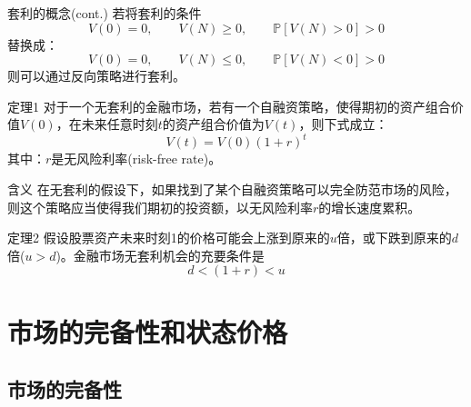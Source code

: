 \documentclass[t]{beamer}
\renewcommand{\Pr}{\mathbb{P}}
\begin{document}
\begin{frame}{套利的概念(cont.)}
若将套利的条件$$V(0)=0,\qquad V(N)\ge 0,\qquad \Pr[V(N)>0]>0 $$
替换成：
\[V(0)=0,\qquad V(N)\le 0,\qquad \Pr[V(N)<0]>0 \]
则可以通过反向策略进行套利。
\end{frame}

\begin{frame}{定理1}
对于一个无套利的金融市场，若有一个自融资策略，使得期初的资产组合价值$V(0)$，在未来任意时刻$t$的资产组合价值为$V(t)$，则下式成立：
\[V(t)=V(0)(1+r)^t \]
其中：$r$是无风险利率(risk-free rate)。

\begin{block}{含义}
在无套利的假设下，如果找到了某个自融资策略可以完全防范市场的风险，则这个策略应当使得我们期初的投资额，以无风险利率$r$的增长速度累积。
\end{block}

\end{frame}

\begin{frame}{定理2}
假设股票资产未来时刻1的价格可能会上涨到原来的$u$倍，或下跌到原来的$d$倍($u>d$)。金融市场无套利机会的充要条件是
\[d<(1+r)<u \]

\begin{block}{}\centering
{}\qquad 
{}
\end{block}

\end{frame}

\section{市场的完备性和状态价格}
\subsection{市场的完备性}
\end{document}
